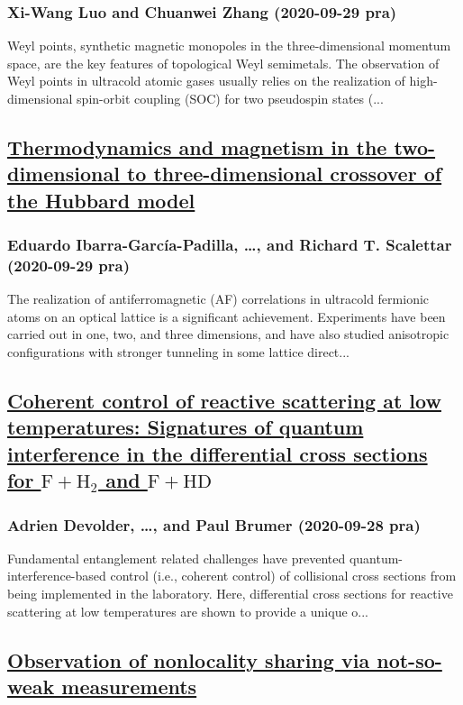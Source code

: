 \subsubsection*{Xi-Wang Luo and Chuanwei Zhang (2020-09-29 pra)}
Weyl points, synthetic magnetic monopoles in the three-dimensional momentum space, are the key features of topological Weyl semimetals. The observation of Weyl points in ultracold atomic gases usually relies on the realization of high-dimensional spin-orbit coupling (SOC) for two pseudospin states (...
\subsection*{\href{http://link.aps.org/doi/10.1103/PhysRevA.102.033340}{Thermodynamics and magnetism in the two-dimensional to three-dimensional crossover of the Hubbard model}}
\subsubsection*{Eduardo Ibarra-García-Padilla, \dots, and Richard T. Scalettar (2020-09-29 pra)}
The realization of antiferromagnetic (AF) correlations in ultracold fermionic atoms on an optical lattice is a significant achievement. Experiments have been carried out in one, two, and three dimensions, and have also studied anisotropic configurations with stronger tunneling in some lattice direct...
\subsection*{\href{http://link.aps.org/doi/10.1103/PhysRevA.102.031303}{Coherent control of reactive scattering at low temperatures: Signatures of quantum interference in the differential cross sections for $\mathrm{F}+ {\mathrm{H}}_{2}$ and $\mathrm{F}+\mathrm{HD}$}}
\subsubsection*{Adrien Devolder, \dots, and Paul Brumer (2020-09-28 pra)}
Fundamental entanglement related challenges have prevented quantum-interference-based control (i.e., coherent control) of collisional cross sections from being implemented in the laboratory. Here, differential cross sections for reactive scattering at low temperatures are shown to provide a unique o...
\subsection*{\href{http://link.aps.org/doi/10.1103/PhysRevA.102.032220}{Observation of nonlocality sharing via not-so-weak measurements}}
